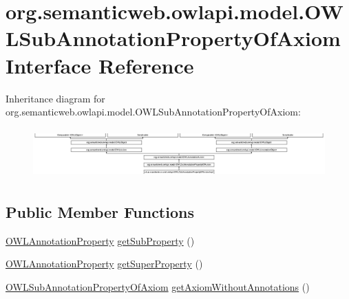 \hypertarget{interfaceorg_1_1semanticweb_1_1owlapi_1_1model_1_1_o_w_l_sub_annotation_property_of_axiom}{\section{org.\-semanticweb.\-owlapi.\-model.\-O\-W\-L\-Sub\-Annotation\-Property\-Of\-Axiom Interface Reference}
\label{interfaceorg_1_1semanticweb_1_1owlapi_1_1model_1_1_o_w_l_sub_annotation_property_of_axiom}
}
Inheritance diagram for org.\-semanticweb.\-owlapi.\-model.\-O\-W\-L\-Sub\-Annotation\-Property\-Of\-Axiom\-:\begin{figure}[H]
\begin{center}
\leavevmode
\includegraphics[height=1.939954cm]{interfaceorg_1_1semanticweb_1_1owlapi_1_1model_1_1_o_w_l_sub_annotation_property_of_axiom}
\end{center}
\end{figure}
\subsection*{Public Member Functions}
\begin{DoxyCompactItemize}
\item 
\hyperlink{interfaceorg_1_1semanticweb_1_1owlapi_1_1model_1_1_o_w_l_annotation_property}{O\-W\-L\-Annotation\-Property} \hyperlink{interfaceorg_1_1semanticweb_1_1owlapi_1_1model_1_1_o_w_l_sub_annotation_property_of_axiom_ab6099af5c1b06769c16d6f7167d6eb57}{get\-Sub\-Property} ()
\item 
\hyperlink{interfaceorg_1_1semanticweb_1_1owlapi_1_1model_1_1_o_w_l_annotation_property}{O\-W\-L\-Annotation\-Property} \hyperlink{interfaceorg_1_1semanticweb_1_1owlapi_1_1model_1_1_o_w_l_sub_annotation_property_of_axiom_a6fe3e38d7ea21dc91699c527bcbf407a}{get\-Super\-Property} ()
\item 
\hyperlink{interfaceorg_1_1semanticweb_1_1owlapi_1_1model_1_1_o_w_l_sub_annotation_property_of_axiom}{O\-W\-L\-Sub\-Annotation\-Property\-Of\-Axiom} \hyperlink{interfaceorg_1_1semanticweb_1_1owlapi_1_1model_1_1_o_w_l_sub_annotation_property_of_axiom_a93e1715df93a88745da7e7c7885e0af8}{get\-Axiom\-Without\-Annotations} ()
\end{DoxyCompactItemize}


